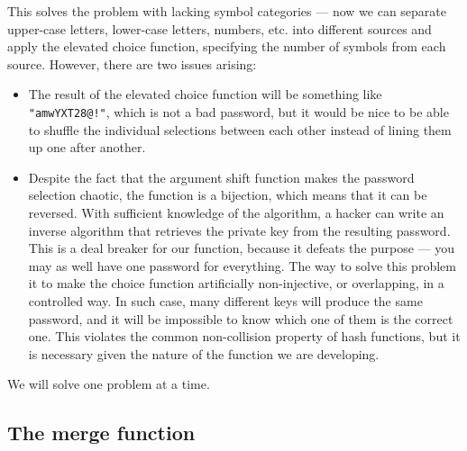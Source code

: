 \documentclass[12pt, a4paper]{article}
\begin{document}
This solves the problem with lacking symbol categories --- now we can separate upper-case letters, lower-case letters, numbers, etc. into different sources and apply the elevated choice function, specifying the number of symbols from each source. However, there are two issues arising:

\begin{itemize}
    \item The result of the elevated choice function will be something like \texttt{"amwYXT28@!"}, which is not a bad password, but it would be nice to be able to shuffle the individual selections between each other instead of lining them up one after another.
    \item Despite the fact that the argument shift function makes the password selection chaotic, the function is a bijection, which means that it can be reversed. With sufficient knowledge of the algorithm, a hacker can write an inverse algorithm that retrieves the private key from the resulting password. This is a deal breaker for our function, because it defeats the purpose --- you may as well have one password for everything. The way to solve this problem it to make the choice function artificially non-injective, or overlapping, in a controlled way. In such case, many different keys will produce the same password, and it will be impossible to know which one of them is the correct one. This violates the common non-collision property of hash functions, but it is necessary given the nature of the function we are developing.
\end{itemize}

We will solve one problem at a time.

\subsection{The merge function}
\end{document}
